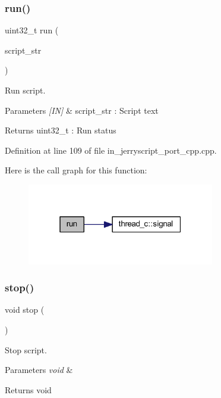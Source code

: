 \subsubsection{run()}
{\footnotesize\ttfamily uint32\+\_\+t run (\begin{DoxyParamCaption}\item[{wx\+String}]{script\+\_\+str }\end{DoxyParamCaption})}



Run script. 


\begin{DoxyParams}{Parameters}
{\em \mbox{[}\+I\+N\mbox{]}} & script\+\_\+str \+: Script text \\
\hline
\end{DoxyParams}
\begin{DoxyReturn}{Returns}
uint32\+\_\+t \+: Run status 
\end{DoxyReturn}


Definition at line 109 of file in\+\_\+jerryscript\+\_\+port\+\_\+cpp.\+cpp.

Here is the call graph for this function\+:\nopagebreak
\begin{figure}[H]
\begin{center}
\leavevmode
\includegraphics[width=232pt]{group___port_gafacd49c835b8497d00c0a928232b12e2_cgraph}
\end{center}
\end{figure}
\mbox{\label{group___port_gaacf6bf8e121fea8b0a92d7197b73fe27}} 
\subsubsection{stop()}
{\footnotesize\ttfamily void stop (\begin{DoxyParamCaption}\item[{void}]{ }\end{DoxyParamCaption})}



Stop script. 


\begin{DoxyParams}{Parameters}
{\em void} & \\
\hline
\end{DoxyParams}
\begin{DoxyReturn}{Returns}
void 
\end{DoxyReturn}


